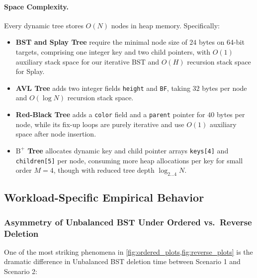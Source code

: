 \documentclass[10pt, a4paper]{article}
\newcommand{\code}[1]{\texttt{\color{primary!90!black}#1}}
\begin{document}
\paragraph{Space Complexity.}
Every dynamic tree stores $O(N)$ nodes in heap memory. Specifically:
\begin{itemize}
  \item \textbf{BST and Splay Tree} require the minimal node size of $24$ bytes on 64-bit targets, comprising one integer key and two child pointers, with $O(1)$ auxiliary stack space for our iterative BST and $O(H)$ recursion stack space for Splay.
  \item \textbf{AVL Tree} adds two integer fields \code{height} and \code{BF}, taking $32$ bytes per node and $O(\log N)$ recursion stack space.
  \item \textbf{Red-Black Tree} adds a \code{color} field and a \code{parent} pointer for $40$ bytes per node, while its fix-up loops are purely iterative and use $O(1)$ auxiliary space after node insertion.
  \item \textbf{$\text{B}^+$ Tree} allocates dynamic key and child pointer arrays \code{keys[4]} and \code{children[5]} per node, consuming more heap allocations per key for small order $M=4$, though with reduced tree depth $\log_{2\dots 4} N$.
\end{itemize}

\subsection{Workload-Specific Empirical Behavior}

\subsubsection{Asymmetry of Unbalanced BST Under Ordered vs.\ Reverse Deletion}
One of the most striking phenomena in \cref{fig:ordered_plots,fig:reverse_plots} is the dramatic difference in Unbalanced BST deletion time between Scenario 1 and Scenario 2:
\end{document}
